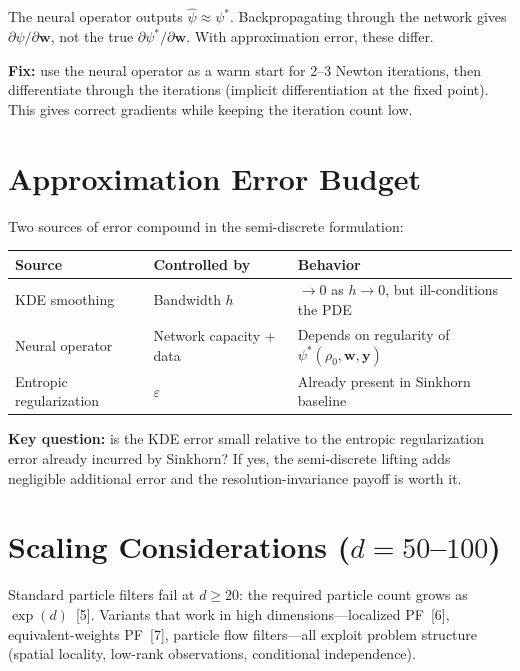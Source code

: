 \documentclass[11pt]{article}
\newcommand{\bw}{\mathbf{w}}
\newcommand{\by}{\mathbf{y}}
\begin{document}
The neural operator outputs $\hat\psi \approx \psi^*$. Backpropagating through the network gives $\partial\hat\psi/\partial\bw$, not the true $\partial\psi^*/\partial\bw$. With approximation error, these differ.

\textbf{Fix:} use the neural operator as a warm start for 2--3 Newton iterations, then differentiate through the iterations (implicit differentiation at the fixed point). This gives correct gradients while keeping the iteration count low.

\section{Approximation Error Budget}

Two sources of error compound in the semi-discrete formulation:

\begin{center}
\begin{tabular}{@{}lll@{}}
\toprule
\textbf{Source} & \textbf{Controlled by} & \textbf{Behavior} \\
\midrule
KDE smoothing & Bandwidth $h$ & $\to 0$ as $h \to 0$, but ill-conditions the PDE \\
Neural operator & Network capacity + data & Depends on regularity of $\psi^*(\rho_0, \bw, \by)$ \\
Entropic regularization & $\varepsilon$ & Already present in Sinkhorn baseline \\
\bottomrule
\end{tabular}
\end{center}

\textbf{Key question:} is the KDE error small relative to the entropic regularization error already incurred by Sinkhorn? If yes, the semi-discrete lifting adds negligible additional error and the resolution-invariance payoff is worth it.

\section{Scaling Considerations ($d = 50$--$100$)}

Standard particle filters fail at $d \geq 20$: the required particle count grows as $\exp(d)$~[5]. Variants that work in high dimensions---localized PF~[6], equivalent-weights PF~[7], particle flow filters---all exploit problem structure (spatial locality, low-rank observations, conditional independence).
\end{document}
